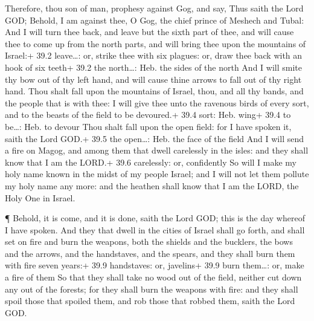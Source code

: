  Therefore, thou son of man, prophesy against Gog, and say,
Thus saith the Lord GOD; Behold, I am against thee, O Gog, the chief
prince of Meshech and Tubal:  And I will turn thee back, and
leave but the sixth part of thee, and will cause thee to come up from
the north parts, and will bring thee upon the mountains of Israel:+ 39.2
leave\ldots: or, strike thee with six plagues: or, draw thee back with
an hook of six teeth+ 39.2 the north\ldots: Heb. the sides of the north
 And I will smite thy bow out of thy left hand, and will
cause thine arrows to fall out of thy right hand.  Thou
shalt fall upon the mountains of Israel, thou, and all thy bands, and
the people that is with thee: I will give thee unto the ravenous birds
of every sort, and to the beasts of the field to be devoured.+ 39.4
sort: Heb. wing+ 39.4 to be\ldots: Heb. to devour  Thou
shalt fall upon the open field: for I have spoken it, saith the Lord
GOD.+ 39.5 the open\ldots: Heb. the face of the field  And I
will send a fire on Magog, and among them that dwell carelessly in the
isles: and they shall know that I am the LORD.+ 39.6 carelessly: or,
confidently  So will I make my holy name known in the midst
of my people Israel; and I will not let them pollute my holy name any
more: and the heathen shall know that I am the LORD, the Holy One in
Israel.

 ¶ Behold, it is come, and it is done, saith the Lord GOD;
this is the day whereof I have spoken.  And they that dwell
in the cities of Israel shall go forth, and shall set on fire and burn
the weapons, both the shields and the bucklers, the bows and the arrows,
and the handstaves, and the spears, and they shall burn them with fire
seven years:+ 39.9 handstaves: or, javelins+ 39.9 burn them\ldots: or,
make a fire of them  So that they shall take no wood out of
the field, neither cut down any out of the forests; for they shall burn
the weapons with fire: and they shall spoil those that spoiled them, and
rob those that robbed them, saith the Lord GOD.

